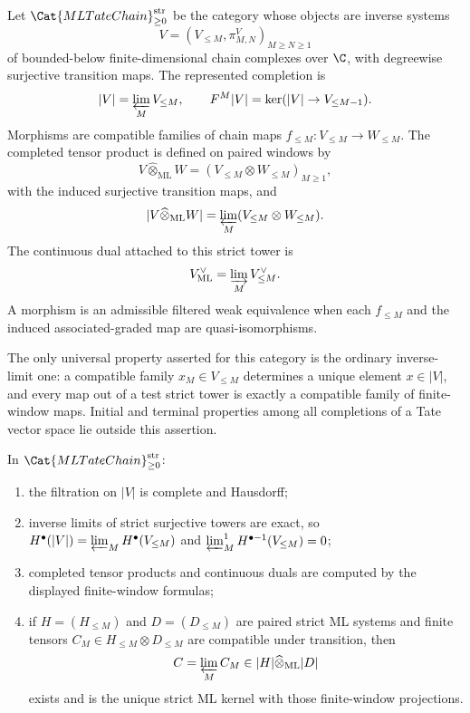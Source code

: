 \begin{defn}
\label{defn:strict-ml-tate-category}
  Let \(\Cat{MLTateChain}_{\geq0}^{\mathrm{str}}\) be the category whose
  objects are inverse systems
  \[
    V=(V_{\leq M},\pi^V_{M,N})_{M\geq N\geq1}
  \]
  of bounded-below finite-dimensional chain complexes over \(\C\), with
  degreewise surjective transition maps.  The represented completion is
  \[
    |V|=\varprojlim_MV_{\leq M},\qquad
    F^M|V|=\ker(|V|\to V_{\leq M-1}).
  \]
  Morphisms are compatible families of chain maps
  \(f_{\leq M}\colon V_{\leq M}\to W_{\leq M}\).  The completed tensor
  product is defined on paired windows by
  \[
    V\widehat\otimes_{\mathrm{ML}}W
      =
    \left(
      V_{\leq M}\otimes W_{\leq M}
    \right)_{M\geq1},
  \]
  with the induced surjective transition maps, and
  \[
    |V\widehat\otimes_{\mathrm{ML}}W|
      =
    \varprojlim_M(V_{\leq M}\otimes W_{\leq M}).
  \]
  The continuous dual attached to this strict tower is
  \[
    V^\vee_{\mathrm{ML}}=\varinjlim_MV_{\leq M}^\vee .
  \]
  A morphism is an admissible filtered weak equivalence when each
  \(f_{\leq M}\) and the induced associated-graded map are
  quasi-isomorphisms.

  The only universal property asserted for this category is the ordinary
  inverse-limit one: a compatible family \(x_M\in V_{\leq M}\) determines
  a unique element \(x\in |V|\), and every map out of a test strict tower
  is exactly a compatible family of finite-window maps.  Initial and
  terminal properties among all completions of a Tate vector space lie
  outside this assertion.
\end{defn}

\begin{prop}
\label{prop:strict-ml-category-exactness}
  In \(\Cat{MLTateChain}_{\geq0}^{\mathrm{str}}\):
  \begin{enumerate}[label=(\roman*)]
    \item the filtration on \(|V|\) is complete and Hausdorff;
    \item inverse limits of strict surjective towers are exact, so
      \(H^\bullet(|V|)=\varprojlim_MH^\bullet(V_{\leq M})\) and
      \(\varprojlim^1_MH^{\bullet-1}(V_{\leq M})=0\);
    \item completed tensor products and continuous duals are computed by
      the displayed finite-window formulas;
    \item if \(H=(H_{\leq M})\) and \(D=(D_{\leq M})\) are paired strict
      ML systems and finite tensors
      \(C_M\in H_{\leq M}\otimes D_{\leq M}\) are compatible under
      transition, then
      \[
        C=\varprojlim_MC_M
          \in |H|\widehat\otimes_{\mathrm{ML}}|D|
      \]
      exists and is the unique strict ML kernel with those finite-window
      projections.
  \end{enumerate}
\end{prop}

